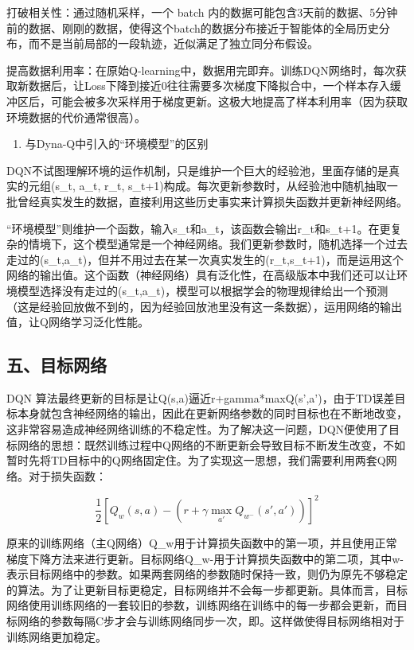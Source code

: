 打破相关性：通过随机采样，一个 batch 内的数据可能包含3天前的数据、5分钟前的数据、刚刚的数据，使得这个batch的数据分布接近于智能体的全局历史分布，而不是当前局部的一段轨迹，近似满足了独立同分布假设。

提高数据利用率：在原始Q-learning中，数据用完即弃。训练DQN网络时，每次获取新数据后，让Loss下降到接近0往往需要多次梯度下降拟合中，一个样本存入缓冲区后，可能会被多次采样用于梯度更新。这极大地提高了样本利用率（因为获取环境数据的代价通常很高）。

\begin{enumerate}
\def\labelenumi{\arabic{enumi}.}
\setcounter{enumi}{2}
\tightlist
\item
  与Dyna-Q中引入的``环境模型''的区别
\end{enumerate}

DQN不试图理解环境的运作机制，只是维护一个巨大的经验池，里面存储的是真实的元组(s\_t, a\_t, r\_t, s\_t+1)构成。每次更新参数时，从经验池中随机抽取一批曾经真实发生的数据，直接利用这些历史事实来计算损失函数并更新神经网络。

``环境模型''则维护一个函数，输入s\_t和a\_t，该函数会输出r\_t和s\_t+1。在更复杂的情境下，这个模型通常是一个神经网络。我们更新参数时，随机选择一个过去走过的(s\_t,a\_t)，但并不用过去在某一次真实发生的(r\_t,s\_t+1)，而是运用这个网络的输出值。这个函数（神经网络）具有泛化性，在高级版本中我们还可以让环境模型选择没有走过的(s\_t,a\_t)，模型可以根据学会的物理规律给出一个预测（这是经验回放做不到的，因为经验回放池里没有这一条数据），运用网络的输出值，让Q网络学习泛化性能。

\hypertarget{ux4e94ux76eeux6807ux7f51ux7edc}{%
\subsection{五、目标网络}\label{ux4e94ux76eeux6807ux7f51ux7edc}}

DQN 算法最终更新的目标是让Q(s,a)逼近r+gamma*maxQ(s',a')，由于TD误差目标本身就包含神经网络的输出，因此在更新网络参数的同时目标也在不断地改变，这非常容易造成神经网络训练的不稳定性。为了解决这一问题，DQN便使用了目标网络的思想：既然训练过程中Q网络的不断更新会导致目标不断发生改变，不如暂时先将TD目标中的Q网络固定住。为了实现这一思想，我们需要利用两套Q网络。对于损失函数：

\[
\frac{1}{2}\left[Q_w(s,a)-\left(r+\gamma\max_{a'}Q_{w^-}(s',a')\right)\right]^2
\]

原来的训练网络（主Q网络）Q\_w用于计算损失函数中的第一项，并且使用正常梯度下降方法来进行更新。目标网络Q\_w-用于计算损失函数中的第二项，其中w-表示目标网络中的参数。如果两套网络的参数随时保持一致，则仍为原先不够稳定的算法。为了让更新目标更稳定，目标网络并不会每一步都更新。具体而言，目标网络使用训练网络的一套较旧的参数，训练网络在训练中的每一步都会更新，而目标网络的参数每隔C步才会与训练网络同步一次，即。这样做使得目标网络相对于训练网络更加稳定。

